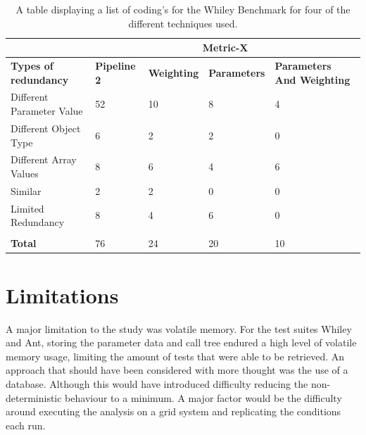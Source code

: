 \begin{table}[]
\centering
\begin{tabular}{|l|l|l|l|l|}
\hline
                             & \multicolumn{4}{c|}{\textbf{Metric-X}}                                                              \\ \hline
\textbf{Types of redundancy} & \textbf{Pipeline 2} & \textbf{Weighting} & \textbf{Parameters} & \textbf{Parameters  And Weighting} \\ \hline
Different Parameter Value    & 52                  & 10                 & 8                   & 4                                  \\ \hline
Different Object Type        & 6                   & 2                  & 2                   & 0                                  \\ \hline
Different Array Values       & 8                   & 6                  & 4                   & 6                                  \\ \hline
Similar                      & 2                   & 2                  & 0                   & 0                                  \\ \hline
Limited Redundancy           & 8                   & 4                  & 6                   & 0                                  \\ \hline
\textbf{}                    &                     &                    &                     &                                    \\ \hline
\textbf{Total}               & 76                  & 24                 & 20                  & 10                                 \\ \hline
\end{tabular}
\caption{A table displaying a list of coding's for the Whiley Benchmark for four of the different techniques used.}
\label{metriccoding}
\end{table}

\section{Limitations}

A major limitation to the study was volatile memory. For the test suites Whiley and Ant, storing the parameter data and call tree endured a high level of volatile memory usage, limiting the amount of tests that were able to be retrieved. An approach that should have been considered with more thought was the use of a database. Although this would have introduced difficulty reducing the non-deterministic behaviour to a minimum. A major factor would be the difficulty around executing the analysis on a grid system and replicating the conditions each run.

